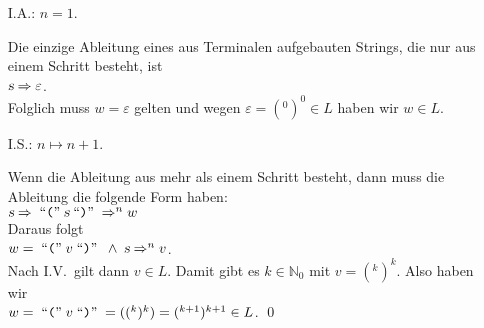 \begin{enumerate}
\item[I.A.:] $n = 1$.
  
            Die einzige Ableitung eines aus Terminalen aufgebauten Strings, die nur aus 
            einem Schritt besteht, ist
            \\[0.2cm]
            \hspace*{1.3cm}
            $\textsl{s} \Rightarrow \varepsilon$.
            \\[0.2cm]
            Folglich muss $w = \varepsilon$ gelten und wegen $\varepsilon = (^0)^0 \in L$
            haben wir $w \in L$.
\item[I.S.:] $n \mapsto n+1$.

            Wenn die Ableitung aus mehr als einem Schritt besteht, dann muss die Ableitung
            die folgende Form haben:
            \\[0.2cm]
            \hspace*{1.3cm}
            $\textsl{s} \Rightarrow \;\mbox{``\texttt{(}''}\; \textsl{s} \;\mbox{``\texttt{)}''}\; \Rightarrow^n w$
            \\[0.2cm]
            Daraus folgt
            \\[0.2cm]
            \hspace*{1.3cm}
            $w = \;\mbox{``\texttt{(}''}\;v\;\mbox{``\texttt{)}''}\; \;\wedge\; \textsl{s} \Rightarrow^n v$.
            \\[0.2cm]
            Nach I.V.~gilt dann $v \in L$.  Damit gibt es $k \in \mathbb{N}_0$ mit $v = (^k)^k$.
            Also haben wir
            \\[0.2cm]
            \hspace*{1.3cm}
            $w = \;\mbox{``\texttt{(}''}\;v\;\mbox{``\texttt{)}''}\; = 
((^k)^k) = (^{k+1})^{k+1} \in L$. \qed
\end{enumerate}


